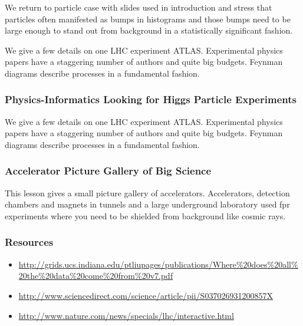 We return to particle case with slides used in introduction and stress
that particles often manifested as bumps in histograms and those bumps
need to be large enough to stand out from background in a statistically
significant fashion.


We give a few details on one LHC experiment ATLAS. Experimental physics
papers have a staggering number of authors and quite big budgets.
Feynman diagrams describe processes in a fundamental fashion.


\subsubsection{Physics-Informatics Looking for Higgs Particle
Experiments}\label{physics-informatics-looking-for-higgs-particle-experiments}

We give a few details on one LHC experiment ATLAS. Experimental physics
papers have a staggering number of authors and quite big budgets.
Feynman diagrams describe processes in a fundamental fashion.


\subsubsection{Accelerator Picture Gallery of Big
Science}\label{accelerator-picture-gallery-of-big-science}

This lesson gives a small picture gallery of accelerators. Accelerators,
detection chambers and magnets in tunnels and a large underground
laboratory used fpr experiments where you need to be shielded from
background like cosmic rays.


\subsubsection{Resources}\label{resources}

\begin{itemize}
\tightlist
\item
  \url{http://grids.ucs.indiana.edu/ptliupages/publications/Where\%20does\%20all\%20the\%20data\%20come\%20from\%20v7.pdf}
\item
  \url{http://www.sciencedirect.com/science/article/pii/S037026931200857X}
\item
  \url{http://www.nature.com/news/specials/lhc/interactive.html}
\end{itemize}

